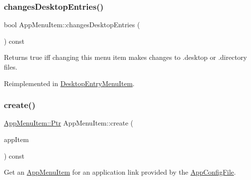 \mbox{\label{classAppMenuItem_a692765630ee15b4acdedc62d2d2e15d8}} 
\subsubsection{\texorpdfstring{changes\+Desktop\+Entries()}{changesDesktopEntries()}}
{\footnotesize\ttfamily bool App\+Menu\+Item\+::changes\+Desktop\+Entries (\begin{DoxyParamCaption}{ }\end{DoxyParamCaption}) const\hspace{0.3cm}{\ttfamily [virtual]}}

\begin{DoxyReturn}{Returns}
true iff changing this menu item makes changes to .desktop or .directory files. 
\end{DoxyReturn}


Reimplemented in \mbox{\hyperlink{classDesktopEntryMenuItem_a4c0415f2a01c9634efa99e9a78a39458}{Desktop\+Entry\+Menu\+Item}}.

\mbox{\label{classAppMenuItem_a4130e499b6bfd43b32fde384e3a90d4a}} 
\subsubsection{\texorpdfstring{create()}{create()}\hspace{0.1cm}{\footnotesize\ttfamily [1/3]}}
{\footnotesize\ttfamily \mbox{\hyperlink{classAppMenuItem_ab5f51c5d74f8df62b8862c0cc8126cb7}{App\+Menu\+Item\+::\+Ptr}} App\+Menu\+Item\+::create (\begin{DoxyParamCaption}\item[{const \mbox{\hyperlink{structAppConfigFile_1_1AppItem}{App\+Config\+File\+::\+App\+Item}} \&}]{app\+Item }\end{DoxyParamCaption}) const\hspace{0.3cm}{\ttfamily [protected]}}

Get an \mbox{\hyperlink{classAppMenuItem}{App\+Menu\+Item}} for an application link provided by the \mbox{\hyperlink{classAppConfigFile}{App\+Config\+File}}.


